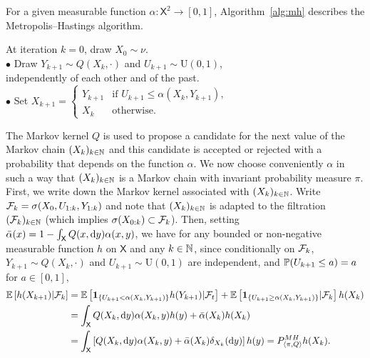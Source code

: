\documentclass[english,graybox,envcountchap,envcountsame,sectrefs,shortlabels]{svmono}
\theoremstyle{style}
\newcommand{\eqsp}{}
\newcommand{\Xset}{\mathsf{X}}
\begin{document}
For a given measurable function $\alpha:\Xset^{2}\to[0,1]$,  Algorithm~\ref{alg:mh} describes the Metropolis--Hastings algorithm.
\begin{algorithm}
\caption{\label{alg:mh}The Metropolis--Hastings algorithm}
{}
\BlankLine
At iteration $k=0$, draw $X_{0}\sim \nu$.\\
{
$\bullet$ Draw $Y_{k+1}\sim Q(X_{k},\cdot)$ and $U_{k+1}\sim\mathrm{U}(0,1)$,\\ \hspace{1em}independently of each other and of the past.\\
$\bullet$ Set $X_{k+1}=\begin{cases} Y_{k+1} & \mbox{if }U_{k+1}\leq\alpha(X_{k},Y_{k+1})\eqsp,\\ X_{k} & \mbox{otherwise}\eqsp. \end{cases}$
}
\end{algorithm}
The Markov kernel $Q$ is used to propose a candidate for the next value of
the Markov chain $(X_{k})_{k\in\mathbb{N}}$ and this candidate is accepted or
rejected with a probability that depends on the function $\alpha$. We now choose conveniently $\alpha$ in such a way that $(X_{k})_{k\in\mathbb{N}}$
is a Markov chain with invariant probability measure $\pi$. 
First, we write down the Markov kernel associated with $(X_{k})_{k\in\mathbb{N}}$. Write $\mathcal{F}_{k}=\sigma(X_{0},U_{1:k},Y_{1:k})$
and note that $(X_{k})_{k\in\mathbb{N}}$ is adapted to the filtration $(\mathcal{F}_{k})_{k\in\mathbb{N}}$
(which implies $\sigma(X_{0:k})\subset\mathcal{F}_{k}$). Then,
setting $\bar{\alpha}(x)=1-\int_{\Xset}Q(x,\rmd y)\alpha(x,y)$, we
have for any bounded or non-negative measurable function $h$ on $\Xset$
and any $k\in\mathbb{N}$,  since conditionally on $\mathcal{F}_k$, $Y_{k+1}\sim Q(X_k,\cdot)$ and $U_{k+1}\sim\mathrm{U}(0,1)$ are independent, and $\mathbb{P}(U_{k+1}\leq a) = a$ for $a\in[0,1]$,
\begin{align*}
\PE\lrb{h(X_{k+1})|\mcf_{k}} & =\PE\lrb{\indiacc{U_{k+1}<\alpha(X_{k},Y_{k+1})}h(Y_{k+1})|\mcf_{t}}+\PE\lrb{\indiacc{U_{k+1}\geq\alpha(X_{k},Y_{k+1})}|\mcf_{k}}h(X_{k})\\
 & =\int_{\Xset}Q(X_{k},\rmd y)\alpha(X_{k},y)h(y)+\bar{\alpha}(X_{k})h(X_{k})\\
 & =\int_{\Xset}\lrb{Q(X_{k},\rmd y)\alpha(X_{k},y)+\bar{\alpha}(X_{k})\delta_{X_{k}}(\rmd y)}h(y)=\mh{\pi,Q}h(X_{k}).
\end{align*}
\end{document}
